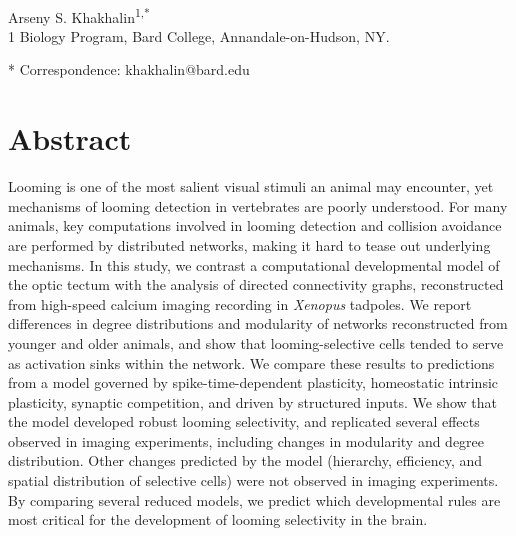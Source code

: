 \documentclass{article}
\begin{document}



\begin{flushleft}
{\Large
\textbf{}
}
\newline
\\
Arseny S. Khakhalin\textsuperscript{1,*}
\\
\bigskip
{1} Biology Program, Bard College, Annandale-on-Hudson, NY. 

* Correspondence: khakhalin@bard.edu






\section*{Abstract}
Looming is one of the most salient visual stimuli an animal may encounter, yet mechanisms of looming detection in vertebrates are poorly understood. For many animals, key computations involved in looming detection and collision avoidance are performed by distributed networks, making it hard to tease out underlying mechanisms. In this study, we contrast a computational developmental model of the optic tectum with the analysis of directed connectivity graphs, reconstructed from high-speed calcium imaging recording in \textit{Xenopus} tadpoles. We report differences in degree distributions and modularity of networks reconstructed from younger and older animals, and show that looming-selective cells tended to serve as activation sinks within the network. We compare these results to predictions from a model governed by spike-time-dependent plasticity, homeostatic intrinsic plasticity, synaptic competition, and driven by structured inputs. We show that the model developed robust looming selectivity, and replicated several effects observed in imaging experiments, including changes in modularity and degree distribution. Other changes predicted by the model (hierarchy, efficiency, and spatial distribution of selective cells) were not observed in imaging experiments. By comparing several reduced models, we predict which developmental rules are most critical for the development of looming selectivity in the brain.
\bigskip

\end{flushleft} %
\end{document}
